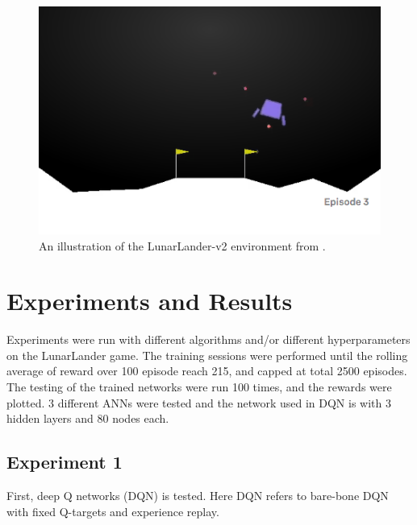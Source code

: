 \documentclass[10pt]{article}
\begin{document}
\begin{figure}[h!]
  \centering
  \includegraphics[width=0.45\linewidth]{illustration.png}
    \caption{An illustration of the LunarLander-v2 environment from .}
  \label{fig:lunarlander}
\end{figure}


\section{Experiments and Results} \label{experiments}
Experiments were run with different algorithms and/or different hyperparameters on the LunarLander game. The training sessions were performed until the rolling average of reward over 100 episode reach 215, and capped at total 2500 episodes. The testing of the trained networks were run 100 times, and the rewards were plotted. 3 different ANNs were tested and the network used in DQN is with 3 hidden layers and 80 nodes each.

\par




\subsection{Experiment 1} \label{experiment1}
First, deep Q networks (DQN) is tested. Here DQN refers to bare-bone DQN with fixed Q-targets and experience replay.\cite{MnihPlayingAtariDeep2013, RoderickImplementingDeepQNetwork2017} \par
\noindent
\end{document}
